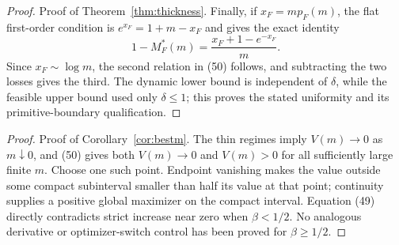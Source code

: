 \documentclass[mnsc,blindrev]{informs3}
\begin{document}
\begin{proof}{Proof of Theorem~\ref{thm:thickness}.}
Finally, if $x_F=mp_F(m)$, the flat first-order condition is
$e^{x_F}=1+m-x_F$ and gives the exact identity
\[
 1-M_F^*(m)=\frac{x_F+1-e^{-x_F}}m.
\]
Since $x_F\sim\log m$, the second relation in (50) follows, and subtracting
the two losses gives the third.  The dynamic lower bound is independent of
$\delta$, while the feasible upper bound used only $\delta\le1$; this proves
the stated uniformity and its primitive-boundary qualification.
\Halmos\end{proof}

\begin{proof}{Proof of Corollary~\ref{cor:bestm}.}
The thin regimes imply $V(m)\to0$ as $m\downarrow0$, and (50) gives both
$V(m)\to0$ and $V(m)>0$ for all sufficiently large finite $m$.  Choose one
such point.  Endpoint vanishing makes the value outside some compact
subinterval smaller than half its value at that point; continuity supplies a
positive global maximizer on the compact interval.  Equation (49) directly
contradicts strict increase near zero when $\beta<1/2$.  No analogous
derivative or optimizer-switch control has been proved for $\beta\ge1/2$.
\Halmos\end{proof}
\end{document}
